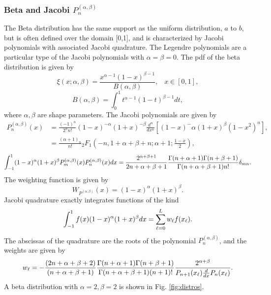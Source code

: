 \subsubsection{Beta and Jacobi $P_n^{(\alpha,\beta)}$}
The Beta distribution has the same support as the uniform distribution, $a$ to $b$, but is often defined over the domain [0,1], and is characterized by Jacobi polynomials with associated Jacobi quadrature.  The Legendre polynomials are a particular type of the Jacobi polynomials with $\alpha=\beta=0$.  The pdf of the beta distribution is given by
\begin{equation}
\xi(x;\alpha,\beta)=\frac{x^{\alpha-1}(1-x)^{\beta-1}}{B(\alpha,\beta)}, \hspace{10pt} x\in[0,1],
\end{equation}
\begin{equation}
B(\alpha,\beta)=\int_0^1 t^{\alpha-1}(1-t)^{\beta-1} dt,
\end{equation}
where $\alpha,\beta$ are shape parameters.  The Jacobi polynomials are given by
\begin{align}
P_n^{(\alpha,\beta)}(x)&=\frac{(-1)^n}{2^nn!}(1-x)^{-\alpha}(1+x)^{-\beta}\frac{d^n}{dx^n}
  \left[(1-x)^-\alpha(1+x)^\beta(1-x^2)^n \right],\\
  &=\frac{(\alpha+1)_n}{n!}{}_2F_1\left(-n,1+\alpha+\beta+n;\alpha+1;\frac{1-x}{2}\right),
\end{align}
\begin{equation}
\int_{-1}^1(1-x)^\alpha(1+x)^\beta P_m^{(\alpha,\beta)}(x)P_n^{(\alpha,\beta)}(x)dx=
    \frac{2^{\alpha+\beta+1}}{2n+\alpha+\beta+1}
    \frac{\Gamma(n+\alpha+1)\Gamma(n+\beta+1)}{\Gamma(n+\alpha+\beta+1)n!}\delta_{mn}.
\end{equation}
The weighting function is given by
\begin{equation}
W_{P^{(\alpha,\beta)}}(x)=(1-x)^\alpha (1+x)^\beta.
\end{equation}
Jacobi quadrature exactly integrates functions of the kind
\begin{equation}
\int_{-1}^1 f(x) (1-x)^\alpha(1+x)^\beta dx = \sum_{\ell=0}^L w_\ell f(x_\ell).
\end{equation}
The abscissas of the quadrature are the roots of the polynomial $P_n^{(\alpha,\beta)}$, and the weights are given by
\begin{equation}
w_\ell=-\frac{(2n+\alpha+\beta+2)}{(n+\alpha+\beta+1)}
  \frac{\Gamma(n+\alpha+1)\Gamma(n+\beta+1)}{\Gamma(n+\alpha+\beta+1)(n+1)!}
  \frac{2^{\alpha+\beta}}{P_{n+1}(x_\ell)\frac{d }{d x}P_n(x_\ell)}.
\end{equation}
A beta distribution with $\alpha=2,\beta=2$ is shown in Fig. \ref{fig:distros}.

